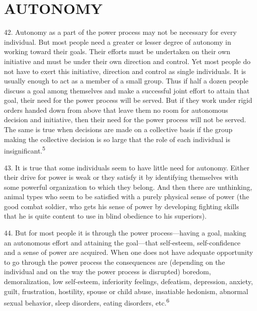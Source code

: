 \documentclass{article}
\begin{document}
\section{AUTONOMY}

\hspace{0.5cm} 42. Autonomy as a part of the power process may not be necessary for every individual. But most 
people need a greater or lesser degree of autonomy in working toward their goals. Their efforts 
must be undertaken on their own initiative and must be under their own direction and control. Yet 
most people do not have to exert this initiative, direction and control as single individuals. It is 
usually enough to act as a member of a small group. Thus if half a dozen people discuss a goal 
among themselves and make a successful joint effort to attain that goal, their need for the power 
process will be served. But if they work under rigid orders handed down from above that leave 
them no room for autonomous decision and initiative, then their need for the power process will 
not be served. The same is true when decisions are made on a collective basis if the group making 
the collective decision is so large that the role of each individual is insignificant.\textsuperscript{5} \vspace{\baselineskip} \newpage

43. It is true that some individuals seem to have little need for autonomy. Either their drive for 
power is weak or they satisfy it by identifying themselves with some powerful organization to 
which they belong. And then there are unthinking, animal types who seem to be satisfied with a 
purely physical sense of power (the good combat soldier, who gets his sense of power by 
developing fighting skills that he is quite content to use in blind obedience to his superiors). \vspace{\baselineskip}

44. But for most people it is through the power process—having a goal, making an autonomous 
effort and attaining the goal—that self-esteem, self-confidence and a sense of power are 
acquired. When one does not have adequate opportunity to go through the power process the 
consequences are (depending on the individual and on the way the power process is disrupted) 
boredom, demoralization, low self-esteem, inferiority feelings, defeatism, depression, anxiety, 
guilt, frustration, hostility, spouse or child abuse, insatiable hedonism, abnormal sexual behavior, 
sleep disorders, eating disorders, etc.\textsuperscript{6}
\end{document}
